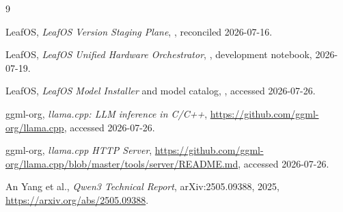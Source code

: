 \documentclass[11pt,letterpaper]{article}
\begin{document}
\newpage
\begin{thebibliography}{9}

LeafOS,
\emph{LeafOS Version Staging Plane},
,
reconciled 2026-07-16.

LeafOS,
\emph{LeafOS Unified Hardware Orchestrator},
,
development notebook, 2026-07-19.

LeafOS,
\emph{LeafOS Model Installer} and model catalog,
,
accessed 2026-07-26.

ggml-org,
\emph{llama.cpp: LLM inference in C/C++},
\url{https://github.com/ggml-org/llama.cpp},
accessed 2026-07-26.

ggml-org,
\emph{llama.cpp HTTP Server},
\url{https://github.com/ggml-org/llama.cpp/blob/master/tools/server/README.md},
accessed 2026-07-26.

An Yang et al.,
\emph{Qwen3 Technical Report},
arXiv:2505.09388, 2025,
\url{https://arxiv.org/abs/2505.09388}.

\end{thebibliography}
\end{document}
